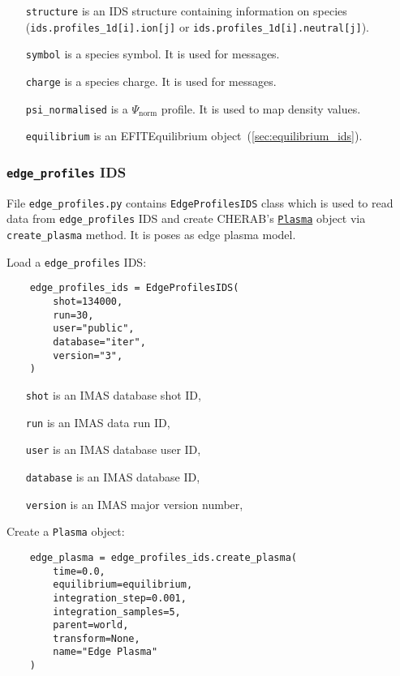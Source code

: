 \documentclass[../main.tex]{subfiles}
\begin{document}
\begin{itemize}[align=left]
    \item[\texttt{structure}] is an IDS structure containing information on species (\texttt{ids.profiles\_1d[i].ion[j]} or \texttt{ids.profiles\_1d[i].neutral[j]}).
    \item[\texttt{symbol}] is a species symbol. It is used for messages.
    \item[\texttt{charge}] is a species charge. It is used for messages.
    \item[\texttt{psi\_normalised}] is a $\Psi_\text{norm}$ profile. It is used to map density values.
    \item[\texttt{equilibrium}] is an EFITEquilibrium object~(\cref{sec:equilibrium_ids}).
\end{itemize}

\subsubsection{\texttt{edge\_profiles} IDS}%
\label{sec:edge_profiles_ids}

File \texttt{edge\_profiles.py} contains \texttt{EdgeProfilesIDS} class which is used to read data from \texttt{edge\_profiles} IDS and create CHERAB's \href{https://cherab.github.io/documentation/plasmas/core_plasma_classes.html?highlight=plasma#cherab.core.Plasma}{\texttt{Plasma}} object via \texttt{create\_plasma} method. It is poses as edge plasma model.

Load a \texttt{edge\_profiles} IDS:
\begin{verbatim}
    edge_profiles_ids = EdgeProfilesIDS(
        shot=134000,
        run=30,
        user="public",
        database="iter",
        version="3",
    )
\end{verbatim}

\begin{itemize}[align=left]
    \item[\texttt{shot}] is an IMAS database shot ID,
    \item[\texttt{run}] is an IMAS data run ID,
    \item[\texttt{user}] is an IMAS database user ID,
    \item[\texttt{database}] is an IMAS database ID,
    \item[\texttt{version}] is an IMAS major version number,
\end{itemize}

Create a \texttt{Plasma} object:
\begin{verbatim}
    edge_plasma = edge_profiles_ids.create_plasma(
        time=0.0,
        equilibrium=equilibrium,
        integration_step=0.001,
        integration_samples=5,
        parent=world,
        transform=None,
        name="Edge Plasma"
    )
\end{verbatim}
\end{document}
